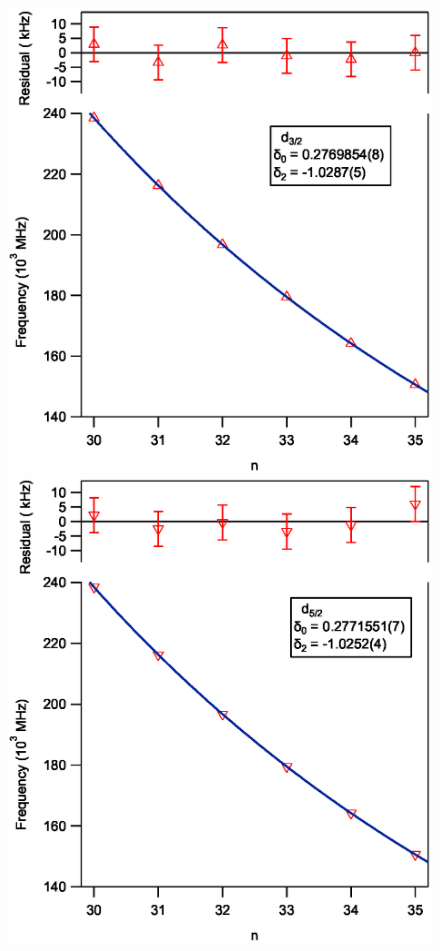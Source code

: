 \documentclass[landscape]{sciposter}
\begin{document}
\begin{multicols}{4}
\begin{figure}
	\begin{center}
		\includegraphics[scale = 0.90]{d32_qd_new.eps}
		\includegraphics[scale = 0.90]{d52_qd_new.eps}
		\caption{}
		\label{qd}
	\end{center}
\end{figure}


\end{multicols}
\end{document}

